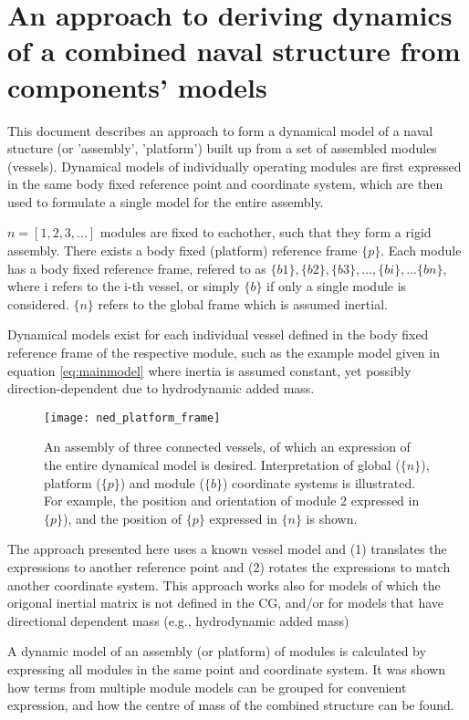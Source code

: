 \chapter{An approach to deriving dynamics of a combined naval structure from components' models}
\label{appendix:CombineDynamics}
This document describes an approach to form a dynamical model of a naval stucture (or 'assembly', 'platform') built up from a set of assembled modules (vessels). Dynamical models of individually operating modules are first expressed in the same body fixed reference point and coordinate system, which are then used to formulate a single model for the entire assembly.

$n = [1,2,3,...]$ modules are fixed to eachother, such that they form a rigid assembly. There exists a body fixed (platform) reference frame $\{p\}$.  Each module has a body fixed reference frame, refered to as $\{b1\}, \{b2\}, \{b3\}, ...,\{bi\},... \{bn\}$, where i refers to the i-th vessel, or simply $\{b\}$ if only a single module is considered. $\{n\}$ refers to the global frame which is assumed inertial. 

Dynamical models exist for each individual vessel defined in the body fixed reference frame of the respective module, such as the example model given in equation \ref{eq:mainmodel} where inertia is assumed constant, yet possibly direction-dependent due to hydrodynamic added mass. 

\begin{figure}[H]
	\centering
	\texttt{[image: ned\_platform\_frame]}
	\caption{An assembly of three connected vessels, of which an expression of the entire dynamical model is desired. Interpretation of global ($\{n\}$), platform ($\{p\}$) and module ($\{b\}$) coordinate systems is illustrated. For example, the position and orientation of module 2 expressed in $\{p\}$), and the position of $\{p\}$ expressed in $\{n\}$ is shown.}
\end{figure}

The approach presented here uses a known vessel model and (1) translates the expressions to another reference point and (2) rotates the expressions to match another coordinate system. This approach works also for models of which the origonal inertial matrix is not defined in the CG, and/or for models that have directional dependent mass (e.g., hydrodynamic added mass) 

A dynamic model of an assembly (or platform) of modules is calculated by expressing all modules in the same point and coordinate system. It was shown how terms from multiple module models can be grouped for convenient expression, and how the centre of mass of the combined structure can be found. 


